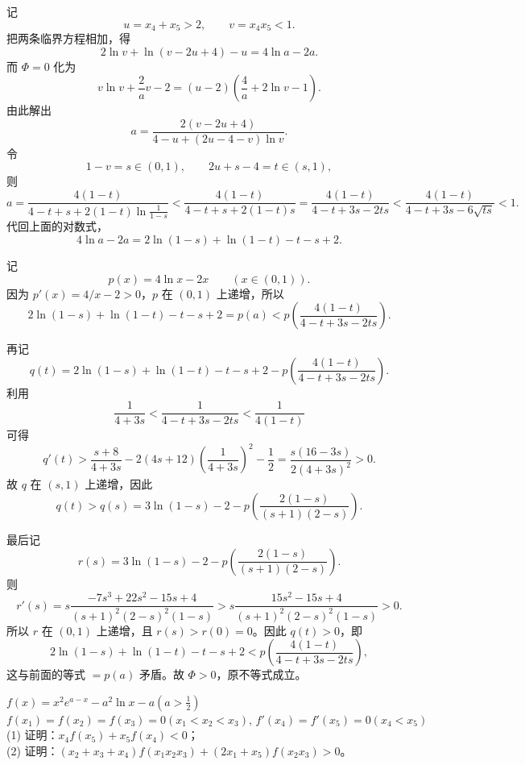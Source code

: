 \begin{solution}
记
\[
u=x_4+x_5>2,\qquad v=x_4x_5<1.
\]
把两条临界方程相加，得
\[
2\ln v+\ln(v-2u+4)-u=4\ln a-2a.
\]
而 \(\Phi=0\) 化为
\[
v\ln v+\frac{2}{a}v-2=(u-2)\left(\frac{4}{a}+2\ln v-1\right).
\]
由此解出
\[
a=\frac{2(v-2u+4)}{4-u+(2u-4-v)\ln v}.
\]
令
\[
1-v=s\in(0,1),\qquad 2u+s-4=t\in(s,1),
\]
则
\[
a=\frac{4(1-t)}{4-t+s+2(1-t)\ln\frac{1}{1-s}}
<\frac{4(1-t)}{4-t+s+2(1-t)s}
=\frac{4(1-t)}{4-t+3s-2ts}
<\frac{4(1-t)}{4-t+3s-6\sqrt{ts}}
<1.
\]
代回上面的对数式，
\[
4\ln a-2a=2\ln(1-s)+\ln(1-t)-t-s+2.
\]

记
\[
p(x)=4\ln x-2x\qquad(x\in(0,1)).
\]
因为 \(p'(x)=4/x-2>0\)，\(p\) 在 \((0,1)\) 上递增，所以
\[
2\ln(1-s)+\ln(1-t)-t-s+2
=p(a)
<p\left(\frac{4(1-t)}{4-t+3s-2ts}\right).
\]

再记
\[
q(t)=2\ln(1-s)+\ln(1-t)-t-s+2-p\left(\frac{4(1-t)}{4-t+3s-2ts}\right).
\]
利用
\[
\frac{1}{4+3s}<\frac{1}{4-t+3s-2ts}<\frac{1}{4(1-t)}
\]
可得
\[
q'(t)>\frac{s+8}{4+3s}-2(4s+12)\left(\frac{1}{4+3s}\right)^2-\frac12
=\frac{s(16-3s)}{2(4+3s)^2}>0.
\]
故 \(q\) 在 \((s,1)\) 上递增，因此
\[
q(t)>q(s)=3\ln(1-s)-2-p\left(\frac{2(1-s)}{(s+1)(2-s)}\right).
\]

最后记
\[
r(s)=3\ln(1-s)-2-p\left(\frac{2(1-s)}{(s+1)(2-s)}\right).
\]
则
\[
r'(s)
=s\frac{-7s^3+22s^2-15s+4}{(s+1)^2(2-s)^2(1-s)}
>s\frac{15s^2-15s+4}{(s+1)^2(2-s)^2(1-s)}
>0.
\]
所以 \(r\) 在 \((0,1)\) 上递增，且 \(r(s)>r(0)=0\)。因此 \(q(t)>0\)，即
\[
2\ln(1-s)+\ln(1-t)-t-s+2
<p\left(\frac{4(1-t)}{4-t+3s-2ts}\right),
\]
这与前面的等式 \(=p(a)\) 矛盾。故 \(\Phi>0\)，原不等式成立。
\end{solution}



\begin{example}[零点与极值题]
$f(x) = x^2 e^{a - x} - a^2 \ln x - a \left(a > \frac{1}{2}\right)$\\
$f(x_1) = f(x_2) = f(x_3) = 0 (x_1 < x_2 < x_3), \, f'(x_4) = f'(x_5) = 0 (x_4 < x_5)$\\
(1) 证明：$x_4 f(x_5) + x_5 f(x_4) < 0$；\\
(2) 证明：$(x_2 + x_3 + x_4) f(x_1 x_2 x_3) + (2x_1 + x_5) f(x_2 x_3) > 0$。
\end{example}

